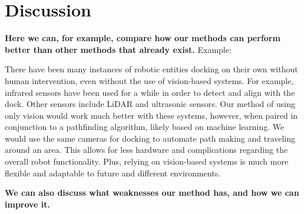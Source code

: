 \section{Discussion}
\textbf{Here we can, for example, compare how our methods can perform better than other methods that already exist.}
Example:

There have been many instances of robotic entities docking on their own without human intervention, even without the use of vision-based systems. For example, infrared sensors have been used for a while in order to detect and align with the dock. Other sensors include LiDAR and ultrasonic sensors. Our method of using only vision would work much better with these systems, however, when paired in conjunction to a pathfinding algorithm, likely based on machine learning. We would use the same cameras for docking to automate path making and traveling around an area. This allows for less hardware and complications regarding the overall robot functionality. Plus, relying on vision-based systems is much more flexible and adaptable to future and different environments.

\textbf{We can also discuss what weaknesses our method has, and how we can improve it.}

